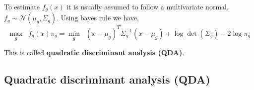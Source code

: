 To estimate $f_g(x)$ it is usually assumed to follow a multivariate normal, $f_g
\sim \mathcal{N}(\mu_g, \Sigma_g)$. Using bayes rule we have,
\begin{equation}
    \max_g \;\; f_g(x)\pi_g = \min_g \;\; (x-\mu_g)^T \Sigma_g^{-1} (x-\mu_g) + \log \det(\Sigma_g)-2\log\pi_g  
\end{equation}

This is called \textbf{quadratic discriminant analysis (QDA)}. 

\subsection{Quadratic discriminant analysis (QDA)}
